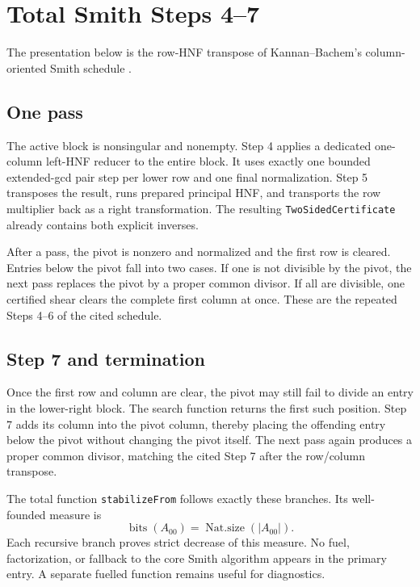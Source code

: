 \documentclass[11pt]{article}
\newcommand{\code}[1]{\texttt{#1}}
\newcommand{\bits}[1]{\operatorname{bits}(#1)}
\begin{document}
\section{Total Smith Steps 4--7}

The presentation below is the row-HNF transpose of Kannan--Bachem's
column-oriented Smith schedule \citep[Algorithm SNF, Steps 4--7,
p.~505]{kannanBachem1979}.

\subsection{One pass}

The active block is nonsingular and nonempty.  Step 4 applies a dedicated
one-column left-HNF reducer to the entire block.  It uses exactly one bounded
extended-gcd pair step per lower row and one final normalization.  Step 5
transposes the result, runs prepared principal HNF, and transports the row
multiplier back as a right transformation.  The resulting
\code{TwoSidedCertificate} already contains both explicit inverses.

After a pass, the pivot is nonzero and normalized and the first row is
cleared.  Entries below the pivot fall into two cases.  If one is not
divisible by the pivot, the next pass replaces the pivot by a proper common
divisor.  If all are divisible, one certified shear clears the complete first
column at once.  These are the repeated Steps 4--6 of the cited schedule.

\subsection{Step 7 and termination}

Once the first row and column are clear, the pivot may still fail to divide an
entry in the lower-right block.  The search function returns the first such
position.  Step 7 adds its column into the pivot column, thereby placing the
offending entry below the pivot without changing the pivot itself.  The next
pass again produces a proper common divisor, matching the cited Step 7 after
the row/column transpose.

The total function \code{stabilizeFrom} follows exactly these branches.  Its
well-founded measure is
\[
  \bits{A_{00}} = \operatorname{Nat.size}(|A_{00}|).
\]
Each recursive branch proves strict decrease of this measure.  No fuel,
factorization, or fallback to the core Smith algorithm appears in the primary
entry.  A separate fuelled function remains useful for diagnostics.
\end{document}
